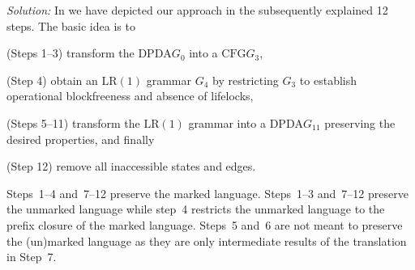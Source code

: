 \documentclass[draft]{ifacconf}
\newcommand{\STEP}[1]{\ensuremath{G_{#1}}\xspace}
\newcommand{\CFG}{\ensuremath{\mathrm{CFG}}\xspace}
\newcommand{\LR}[1][1]{\ensuremath{\mathrm{LR}(#1)}\xspace}
\newcommand{\DPDA}{\ensuremath{\mathrm{DPDA}}\xspace}
\begin{document}

\emph{Solution:} In  we have depicted our approach in the subsequently explained 12 steps.
The basic idea is to
\begin{inparaenum}[]
\item (Steps 1--3) transform the \DPDA \STEP{0} into a \CFG \STEP{3},
\item (Step 4) obtain an \LR grammar \STEP{4} by restricting \STEP{3} to establish operational blockfreeness and absence of lifelocks,
\item (Steps 5--11) transform the \LR grammar into a \DPDA \STEP{11} preserving the desired properties, and finally
\item (Step 12) remove all inaccessible states and edges.
\end{inparaenum}

Steps~1--4 and~7--12 preserve the marked language.
Steps~1--3 and~7--12 preserve the unmarked language while step~4 restricts the unmarked language to the prefix closure of the marked language.
Steps~5 and~6 are not meant to preserve the (un)marked language as they are only intermediate results of the translation in Step~7.
\end{document}
